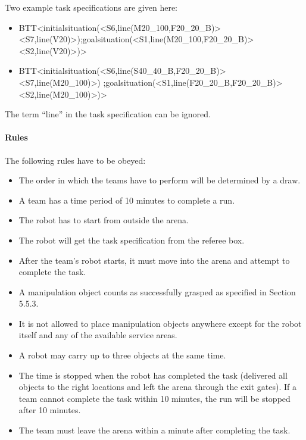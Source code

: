 Two example task specifications are given here:
\begin{itemize}
\item BTT\textless initialsituation(\textless S6,line(M20\_100,F20\_20\_B)\textgreater \textless S7,line(V20)\textgreater);goalsituation(\textless S1,line(M20\_100,F20\_20\_B)\textgreater \textless S2,line(V20)\textgreater )\textgreater
\item  BTT\textless initialsituation(\textless S6,line(S40\_40\_B,F20\_20\_B)\textgreater \textless S7,line(M20\_100)\textgreater) ;goalsituation(\textless S1,line(F20\_20\_B,F20\_20\_B)>\textless S2,line(M20\_100)\textgreater )\textgreater

\end{itemize}

The term “line” in the task specification can be ignored.

%

\paragraph{Rules}
The following rules have to be obeyed:

\begin{itemize}
\item The order in which the teams have to perform will be determined by a draw.
\item A team has a time period of 10 minutes to complete a run.
\item The robot has to start from outside the arena.
\item The robot will get the task specification from the referee box.
\item After the team’s robot starts, it must move into the arena and attempt to complete the task. 
\item A manipulation object counts as successfully grasped as specified in Section 5.5.3. 
\item It is not allowed to place manipulation objects anywhere except for the robot itself and any of the available service areas.
\item A robot may carry up to three objects at the same time.
\item The time is stopped when the robot has completed the task (delivered all objects to the right locations and left the arena through the exit gates). If a team cannot complete the task within 10 minutes, the run will be stopped after 10 minutes. 
\item The team must leave the arena within a minute after completing the task.
\end{itemize}


